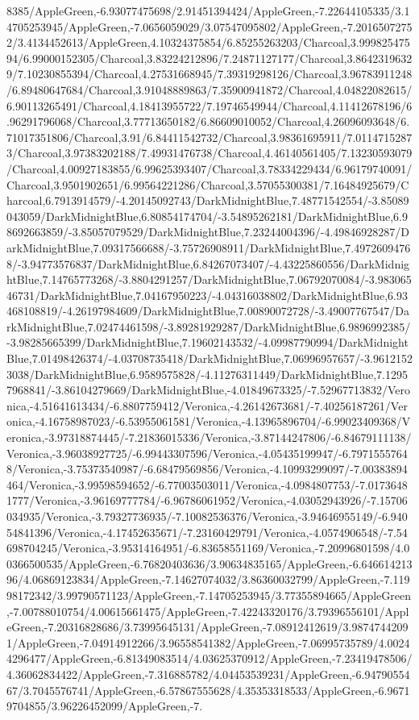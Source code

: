 {\begin{tikzternal}
8385/AppleGreen,-6.93077475698/2.91451394424/AppleGreen,-7.22644105335/3.14705253945/AppleGreen,-7.0656059029/3.07547095802/AppleGreen,-7.20165072752/3.4134452613/AppleGreen,4.10324375854/6.85255263203/Charcoal,3.99982547594/6.99000152305/Charcoal,3.83224212896/7.24871127177/Charcoal,3.86423196329/7.10230855394/Charcoal,4.27531668945/7.39319298126/Charcoal,3.96783911248/6.89480647684/Charcoal,3.91048889863/7.35900941872/Charcoal,4.04822082615/6.90113265491/Charcoal,4.18413955722/7.19746549944/Charcoal,4.11412678196/6.96291796068/Charcoal,3.77713650182/6.86609010052/Charcoal,4.26096093648/6.71017351806/Charcoal,3.91/6.84411542732/Charcoal,3.98361695911/7.01147152873/Charcoal,3.97383202188/7.49931476738/Charcoal,4.46140561405/7.13230593079/Charcoal,4.00927183855/6.99625393407/Charcoal,3.78334229434/6.96179740091/Charcoal,3.9501902651/6.99564221286/Charcoal,3.57055300381/7.16484925679/Charcoal,6.7913914579/-4.20145092743/DarkMidnightBlue,7.48771542554/-3.85089043059/DarkMidnightBlue,6.80854174704/-3.54895262181/DarkMidnightBlue,6.98692663859/-3.85057079529/DarkMidnightBlue,7.23244004396/-4.49846928287/DarkMidnightBlue,7.09317566688/-3.75726908911/DarkMidnightBlue,7.49726094768/-3.94773576837/DarkMidnightBlue,6.84267073407/-4.43225860556/DarkMidnightBlue,7.14765773268/-3.8804291257/DarkMidnightBlue,7.06792070084/-3.98306546731/DarkMidnightBlue,7.04167950223/-4.04316038802/DarkMidnightBlue,6.93468108819/-4.26197984609/DarkMidnightBlue,7.00890072728/-3.49007767547/DarkMidnightBlue,7.02474461598/-3.89281929287/DarkMidnightBlue,6.9896992385/-3.98285665399/DarkMidnightBlue,7.19602143532/-4.09987790994/DarkMidnightBlue,7.01498426374/-4.03708735418/DarkMidnightBlue,7.06996957657/-3.96121523038/DarkMidnightBlue,6.9589575828/-4.11276311449/DarkMidnightBlue,7.12957968841/-3.86104279669/DarkMidnightBlue,-4.01849673325/-7.52967713832/Veronica,-4.51641613434/-6.8807759412/Veronica,-4.26142673681/-7.40256187261/Veronica,-4.16758987023/-6.53955061581/Veronica,-4.13965896704/-6.99023409368/Veronica,-3.97318874445/-7.21836015336/Veronica,-3.87144247806/-6.84679111138/Veronica,-3.96038927725/-6.99443307596/Veronica,-4.05435199947/-6.79715557648/Veronica,-3.75373540987/-6.68479569856/Veronica,-4.10993299097/-7.00383894464/Veronica,-3.99598594652/-6.77003503011/Veronica,-4.0984807753/-7.01736481777/Veronica,-3.96169777784/-6.96786061952/Veronica,-4.03052943926/-7.15706034935/Veronica,-3.79327736935/-7.10082536376/Veronica,-3.94646955149/-6.94054841396/Veronica,-4.17452635671/-7.23160429791/Veronica,-4.0574906548/-7.54698704245/Veronica,-3.95314164951/-6.83658551169/Veronica,-7.20996801598/4.00366500535/AppleGreen,-6.76820403636/3.90634835165/AppleGreen,-6.64661421396/4.06869123834/AppleGreen,-7.14627074032/3.86360032799/AppleGreen,-7.11998172342/3.99790571123/AppleGreen,-7.14705253945/3.77355894665/AppleGreen,-7.00788010754/4.00615661475/AppleGreen,-7.42243320176/3.79396556101/AppleGreen,-7.20316828686/3.73995645131/AppleGreen,-7.08912412619/3.98747442091/AppleGreen,-7.04914912266/3.96558541382/AppleGreen,-7.06995735789/4.00244296477/AppleGreen,-6.81349083514/4.03625370912/AppleGreen,-7.23419478506/4.36062834422/AppleGreen,-7.316885782/4.04453539231/AppleGreen,-6.9479055467/3.7045576741/AppleGreen,-6.57867555628/4.35353318533/AppleGreen,-6.96719704855/3.96226452099/AppleGreen,-7.
\end{tikzternal}}
